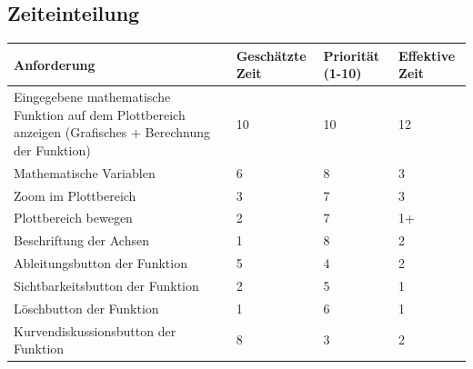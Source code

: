 \documentclass[a4paper]{article}
\begin{document}
\subsection{Zeiteinteilung}
\begin{table}[h]
	\centering
	\begin{tabular}{|p{5cm}|p{2cm}|p{2cm}|p{2cm}|}
		\hline
		\textbf{Anforderung}                                                                                    & \textbf{Geschätzte Zeit} & \textbf{Priorität (1-10)} & \textbf{Effektive Zeit} \\
		\hline
		Eingegebene mathematische Funktion auf dem Plottbereich anzeigen (Grafisches + Berechnung der Funktion) & 10                       & 10                        & 12                      \\
		\hline
		Mathematische Variablen                                                                                 & 6                        & 8                         & 3                       \\
		\hline
		Zoom im Plottbereich                                                                                    & 3                        & 7                         & 3                       \\
		\hline
		Plottbereich bewegen                                                                                    & 2                        & 7                         & 1+                      \\
		\hline
		Beschriftung der Achsen                                                                                 & 1                        & 8                         & 2                       \\
		\hline
		Ableitungsbutton der Funktion                                                                           & 5                        & 4                         & 2                       \\
		\hline
		Sichtbarkeitsbutton der Funktion                                                                        & 2                        & 5                         & 1                       \\
		\hline
		Löschbutton der Funktion                                                                                & 1                        & 6                         & 1                       \\
		\hline
		Kurvendiskussionsbutton der Funktion                                                                    & 8                        & 3                         & 2                       \\

\end{tabular}
\end{table}
\end{document}
